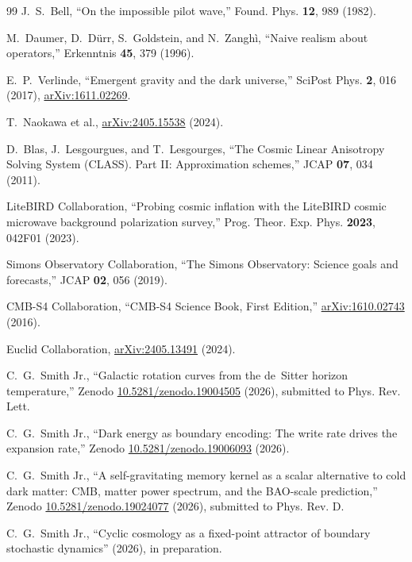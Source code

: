 \documentclass[aps,prd,twocolumn,superscriptaddress,nofootinbib]{revtex4-2}
\begin{document}
\begin{thebibliography}{99}
 J.~S.~Bell, ``On the impossible pilot wave,'' Found. Phys. \textbf{12}, 989 (1982).

 M.~Daumer, D.~D\"{u}rr, S.~Goldstein, and N.~Zangh\`{i}, ``Naive realism about operators,'' Erkenntnis \textbf{45}, 379 (1996).

 E.~P.~Verlinde, ``Emergent gravity and the dark universe,'' SciPost Phys. \textbf{2}, 016 (2017), \href{https://arxiv.org/abs/1611.02269}{arXiv:1611.02269}.

 T.~Naokawa et al., \href{https://arxiv.org/abs/2405.15538}{arXiv:2405.15538} (2024).

 D.~Blas, J.~Lesgourgues, and T.~Lesgourges, ``The Cosmic Linear Anisotropy Solving System (CLASS). Part II: Approximation schemes,'' JCAP \textbf{07}, 034 (2011).

 LiteBIRD Collaboration, ``Probing cosmic inflation with the LiteBIRD cosmic microwave background polarization survey,'' Prog. Theor. Exp. Phys. \textbf{2023}, 042F01 (2023).

 Simons Observatory Collaboration, ``The Simons Observatory: Science goals and forecasts,'' JCAP \textbf{02}, 056 (2019).

 CMB-S4 Collaboration, ``CMB-S4 Science Book, First Edition,'' \href{https://arxiv.org/abs/1610.02743}{arXiv:1610.02743} (2016).

 Euclid Collaboration, \href{https://arxiv.org/abs/2405.13491}{arXiv:2405.13491} (2024).

 C.~G.~Smith Jr., ``Galactic rotation curves from the de~Sitter horizon temperature,'' Zenodo \href{https://doi.org/10.5281/zenodo.19004505}{10.5281/zenodo.19004505} (2026), submitted to Phys. Rev. Lett.

 C.~G.~Smith Jr., ``Dark energy as boundary encoding: The write rate drives the expansion rate,'' Zenodo \href{https://doi.org/10.5281/zenodo.19006093}{10.5281/zenodo.19006093} (2026).

 C.~G.~Smith Jr., ``A self-gravitating memory kernel as a scalar alternative to cold dark matter: CMB, matter power spectrum, and the BAO-scale prediction,'' Zenodo \href{https://doi.org/10.5281/zenodo.19024077}{10.5281/zenodo.19024077} (2026), submitted to Phys. Rev. D.

 C.~G.~Smith Jr., ``Cyclic cosmology as a fixed-point attractor of boundary stochastic dynamics'' (2026), in preparation.

\end{thebibliography}
\end{document}
